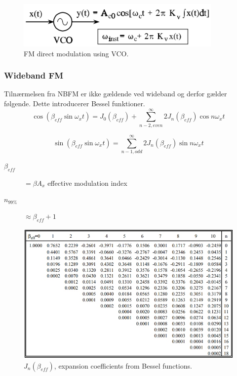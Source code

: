 \begin{figure} [H]
	\centering
	\includegraphics[width=0.65\linewidth]{graphics/12.png}
	\caption{FM direct modulation using VCO.}
	\label{fig:12}
\end{figure}

\subsubsection{Wideband FM}
Tilnærmelsen fra NBFM er ikke gældende ved wideband og derfor gælder følgende. Dette introducerer Bessel funktioner.
\begin{equation}
\cos(\beta_{eff}\sin\omega_x t)=J_0(\beta_{eff})+\sum_{n-2,even}^{\infty}2 J_n(\beta_{eff})\cos n \omega_x t
\end{equation}

\begin{equation}
\sin(\beta_{eff}\sin\omega_x t)=\sum_{n-1,odd}^{\infty}2 J_n(\beta_{eff})\sin n \omega_x t
\end{equation}

\begin{description}
	\item[$\beta_{eff}$] $=\beta A_x$ effective modulation index
	\item[$n_{99\%}$] $\approx \beta_{eff}+1$ 
\end{description}

\begin{figure} [H]
	\centering
	\includegraphics[width=\linewidth]{graphics/13.png}
	\caption{$J_n(\beta_{eff})$, expansion coefficients from Bessel functions.}
	\label{fig:13}
\end{figure}

